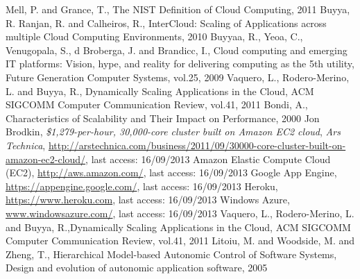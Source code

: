 \documentclass[twocolumn]{svjour3}          %
\begin{document}


\begin{thebibliography}{}
%
%
  {Mell, P. and Grance, T.}, {The NIST Definition of Cloud Computing}, 2011
  {Buyya, R. Ranjan, R. and Calheiros, R.}, {InterCloud: Scaling of Applications across multiple Cloud Computing Environments}, 2010
  {Buyyaa, R., Yeoa, C., Venugopala, S., d Broberga, J. and Brandicc, I.}, {Cloud computing and emerging IT platforms: Vision, hype, and reality for delivering computing as the 5th utility}, {Future Generation Computer Systems}, vol.25, 2009
  {Vaquero, L., Rodero-Merino, L. and Buyya, R.}, {Dynamically Scaling Applications in the Cloud}, {ACM SIGCOMM Computer Communication Review}, vol.41, 2011
  Bondi, A., {Characteristics of Scalability and Their Impact on Performance}, 2000
  Jon Brodkin, \emph{\$1,279-per-hour, 30,000-core cluster built on Amazon EC2 cloud}, {\emph{Ars Technica}, \url{http://arstechnica.com/business/2011/09/30000-core-cluster-built-on-amazon-ec2-cloud/}}, last access: 16/09/2013
  {Amazon Elastic Compute Cloud (EC2)}, {\url{http://aws.amazon.com/}}, last access: 16/09/2013 
  {Google App Engine}, {\url{https://appengine.google.com/}}, last access: 16/09/2013 
  {Heroku}, {\url{https://www.heroku.com}}, last access: 16/09/2013 
  {Windows Azure}, {\url{www.windowsazure.com/}}, last access: 16/09/2013 
  {Vaquero, L., Rodero-Merino, L. and Buyya, R.},{Dynamically Scaling Applications in the Cloud}, {ACM SIGCOMM Computer Communication Review}, vol.41, 2011
 {Litoiu, M. and Woodside, M. and Zheng, T.}, {Hierarchical Model-based Autonomic Control of Software Systems}, {Design and evolution of autonomic application software}, 2005


\end{thebibliography}
\end{document}
